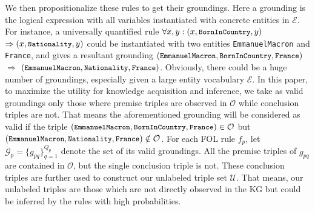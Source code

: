 \documentclass[letterpaper]{article} \usepackage{aaai18}  \usepackage{times}  \usepackage{helvet}  \usepackage{courier}  \usepackage{url}  \usepackage{graphicx}  \usepackage{amsmath}
\begin{document}
We then propositionalize these rules to get their groundings. Here a grounding is the logical expression with all variables instantiated with concrete entities in $\mathcal{E}$. For instance, a universally quantified rule $\forall x, y: (x, \texttt{\small BornInCountry}, y)$ $\Rightarrow (x, \texttt{\small Nationality}, y)$ could be instantiated with two entities \texttt{\small EmmanuelMacron} and \texttt{\small France}, and gives a resultant grounding $(\texttt{\small EmmanuelMacron}, \texttt{\small BornInCountry}, \texttt{\small France})$ $\Rightarrow$ $(\texttt{\small EmmanuelMacron}, \texttt{\small Nationality}, \texttt{\small France})$. Obviously, there could be a huge number of groundings, especially given a large entity vocabulary $\mathcal{E}$. In this paper, to maximize the utility for knowledge acquisition and inference, we take as valid groundings only those where premise triples are observed in $\mathcal{O}$ while conclusion triples are not. That means the aforementioned grounding will be considered as valid if the triple $(\texttt{\small EmmanuelMacron}, \texttt{\small BornInCountry}, \texttt{\small France}) \in \mathcal{O}$ but $(\texttt{\small EmmanuelMacron}, \texttt{\small Nationality}, \texttt{\small France}) \notin \mathcal{O}$. For each FOL rule $f_p$, let $\mathcal{G}_p=\{g_{pq}\}_{q=1}^{Q_p}$ denote the set of its valid groundings. All the premise triples of $g_{pq}$ are contained in $\mathcal{O}$, but the single conclusion triple is not. These conclusion triples are further used to construct our unlabeled triple set $\mathcal{U}$. That means, our unlabeled triples are those which are not directly observed in the KG but could be inferred by the rules with high probabilities.
\end{document}
